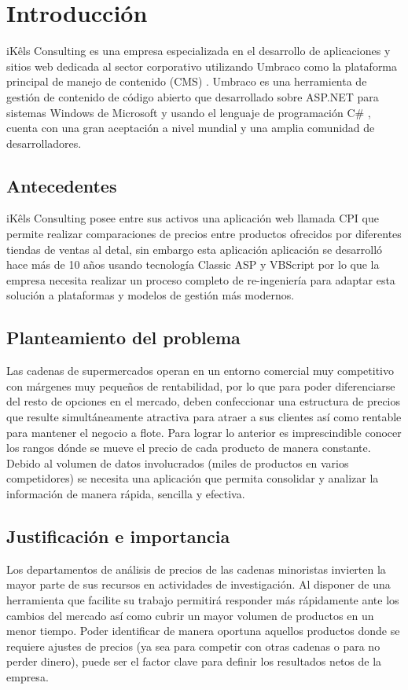 \chapter*{Introducción}
iKêls Consulting \cite{ikels} es una empresa especializada en el desarrollo de aplicaciones y sitios web dedicada al sector corporativo utilizando Umbraco como la plataforma principal de manejo de contenido (CMS) \cite{cmsBarker}. Umbraco es una herramienta de gestión de contenido de código abierto que desarrollado sobre ASP.NET \cite{aspMicrosoft} para sistemas Windows de Microsoft y usando el lenguaje de programación C\# \cite{cSharpMicrosoft}, cuenta con una gran aceptación a nivel mundial y una amplia comunidad de desarrolladores.

\section*{Antecedentes}
 iKêls Consulting \cite{ikels} posee entre sus activos una aplicación web llamada CPI que permite realizar comparaciones de precios entre productos ofrecidos por diferentes tiendas de ventas al detal, sin embargo esta aplicación aplicación se desarrolló hace más de 10 años usando tecnología Classic ASP y VBScript por lo que la empresa necesita realizar un proceso completo de re-ingeniería para adaptar esta solución a plataformas y modelos de gestión más modernos.


\section*{Planteamiento del problema}
Las cadenas de supermercados operan en un entorno comercial muy competitivo con márgenes muy pequeños de rentabilidad, por lo que para poder diferenciarse del resto de opciones en el mercado, deben confeccionar una estructura de precios que resulte simultáneamente atractiva para atraer a sus clientes así como rentable para mantener el negocio a flote.
Para lograr lo anterior es imprescindible conocer los rangos dónde  se mueve el precio de cada producto de manera constante. Debido al volumen de datos involucrados (miles de productos en varios competidores) se necesita una aplicación que permita consolidar y analizar la información de manera rápida, sencilla y efectiva.
\section*{Justificación e importancia}
Los departamentos de análisis de precios de las cadenas minoristas invierten la mayor parte de sus recursos en actividades de investigación.
Al disponer de una herramienta que facilite su trabajo permitirá responder más rápidamente ante los cambios del mercado así como cubrir un mayor volumen de productos en un menor  tiempo. Poder identificar de manera oportuna aquellos productos donde se requiere ajustes de precios (ya sea para competir con otras cadenas o para no perder dinero), puede ser el factor clave para definir los resultados netos de la empresa.
